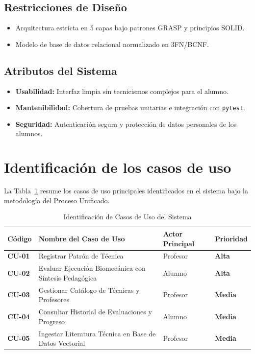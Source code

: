 \subsection{Restricciones de Diseño}
\begin{itemize}
    \item Arquitectura estricta en 5 capas bajo patrones GRASP y principios SOLID.
    \item Modelo de base de datos relacional normalizado en 3FN/BCNF.
\end{itemize}

\subsection{Atributos del Sistema}
\begin{itemize}
    \item \textbf{Usabilidad:} Interfaz limpia sin tecnicismos complejos para el alumno.
    \item \textbf{Mantenibilidad:} Cobertura de pruebas unitarias e integración con \texttt{pytest}.
    \item \textbf{Seguridad:} Autenticación segura y protección de datos personales de los alumnos.
\end{itemize}

\newpage

\section{Identificación de los casos de uso}

La Tabla~\ref{tab:casos_de_uso} resume los casos de uso principales identificados en el sistema bajo la metodología del Proceso Unificado.

\begin{table}[htbp]
\centering
\small
\begin{tabularx}{\textwidth}{|>{\bfseries}l|X|l|>{\bfseries}l|}
    \hline
    Código & Nombre del Caso de Uso & Actor Principal & Prioridad \\ \hline
    CU-01 & Registrar Patrón de Técnica & Profesor & Alta \\ \hline
    CU-02 & Evaluar Ejecución Biomecánica con Síntesis Pedagógica & Alumno & Alta \\ \hline
    CU-03 & Gestionar Catálogo de Técnicas y Profesores & Profesor & Media \\ \hline
    CU-04 & Consultar Historial de Evaluaciones y Progreso & Alumno & Media \\ \hline
    CU-05 & Ingestar Literatura Técnica en Base de Datos Vectorial & Profesor & Media \\ \hline
\end{tabularx}
\caption{Identificación de Casos de Uso del Sistema}
\label{tab:casos_de_uso}
\end{table}

